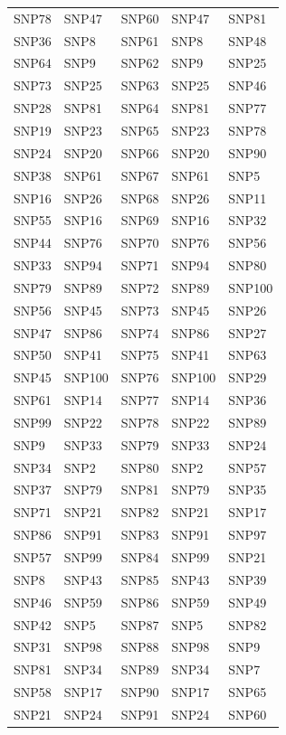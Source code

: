 \begin{table}[ht]
\begin{tabular}{lllll}
  SNP78 & SNP47 & SNP60 & SNP47 & SNP81 \\ 
  SNP36 & SNP8 & SNP61 & SNP8 & SNP48 \\ 
  SNP64 & SNP9 & SNP62 & SNP9 & SNP25 \\ 
  SNP73 & SNP25 & SNP63 & SNP25 & SNP46 \\ 
  SNP28 & SNP81 & SNP64 & SNP81 & SNP77 \\ 
  SNP19 & SNP23 & SNP65 & SNP23 & SNP78 \\ 
  SNP24 & SNP20 & SNP66 & SNP20 & SNP90 \\ 
  SNP38 & SNP61 & SNP67 & SNP61 & SNP5 \\ 
  SNP16 & SNP26 & SNP68 & SNP26 & SNP11 \\ 
  SNP55 & SNP16 & SNP69 & SNP16 & SNP32 \\ 
  SNP44 & SNP76 & SNP70 & SNP76 & SNP56 \\ 
  SNP33 & SNP94 & SNP71 & SNP94 & SNP80 \\ 
  SNP79 & SNP89 & SNP72 & SNP89 & SNP100 \\ 
  SNP56 & SNP45 & SNP73 & SNP45 & SNP26 \\ 
  SNP47 & SNP86 & SNP74 & SNP86 & SNP27 \\ 
  SNP50 & SNP41 & SNP75 & SNP41 & SNP63 \\ 
  SNP45 & SNP100 & SNP76 & SNP100 & SNP29 \\ 
  SNP61 & SNP14 & SNP77 & SNP14 & SNP36 \\ 
  SNP99 & SNP22 & SNP78 & SNP22 & SNP89 \\ 
  SNP9 & SNP33 & SNP79 & SNP33 & SNP24 \\ 
  SNP34 & SNP2 & SNP80 & SNP2 & SNP57 \\ 
  SNP37 & SNP79 & SNP81 & SNP79 & SNP35 \\ 
  SNP71 & SNP21 & SNP82 & SNP21 & SNP17 \\ 
  SNP86 & SNP91 & SNP83 & SNP91 & SNP97 \\ 
  SNP57 & SNP99 & SNP84 & SNP99 & SNP21 \\ 
  SNP8 & SNP43 & SNP85 & SNP43 & SNP39 \\ 
  SNP46 & SNP59 & SNP86 & SNP59 & SNP49 \\ 
  SNP42 & SNP5 & SNP87 & SNP5 & SNP82 \\ 
  SNP31 & SNP98 & SNP88 & SNP98 & SNP9 \\ 
  SNP81 & SNP34 & SNP89 & SNP34 & SNP7 \\ 
  SNP58 & SNP17 & SNP90 & SNP17 & SNP65 \\ 
  SNP21 & SNP24 & SNP91 & SNP24 & SNP60 \\ 

\end{tabular}
\end{table}
